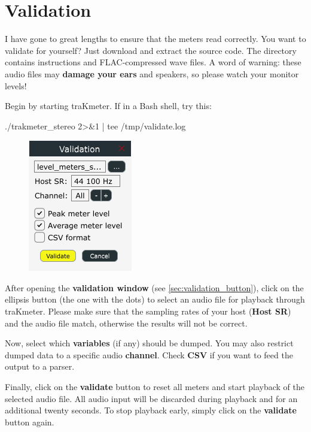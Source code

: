 \chapter{Validation}
\label{chap:validation}

I have gone to great lengths to ensure that the meters read correctly.
You want to validate for yourself?  Just download and extract the
source code.  The directory  contains instructions
and FLAC-compressed wave files.  A word of warning: these audio files
may \textbf{damage your ears} and speakers, so please watch your
monitor levels!

Begin by starting traKmeter.  If in a Bash shell, try this:

\begin{VerbatimBoth}
  ./trakmeter_stereo 2>&1 | tee /tmp/validate.log
\end{VerbatimBoth}

\begin{figure}
  \includegraphics[scale=0.60,clip]{include/images/dialog_validation.png}
\end{figure}

After opening the \textbf{validation window} (see
\ref{sec:validation_button}), click on the ellipsis button (the one
with the dots) to select an audio file for playback through traKmeter.
Please make sure that the sampling rates of your host (\textbf{Host
  SR}) and the audio file match, otherwise the results will not be
correct.

Now, select which \textbf{variables} (if any) should be dumped.  You
may also restrict dumped data to a specific audio \textbf{channel}.
Check \textbf{CSV} if you want to feed the output to a parser.

Finally, click on the \textbf{validate} button to reset all meters and
start playback of the selected audio file.  All audio input will be
discarded during playback and for an additional twenty seconds.  To
stop playback early, simply click on the \textbf{validate} button
again.


